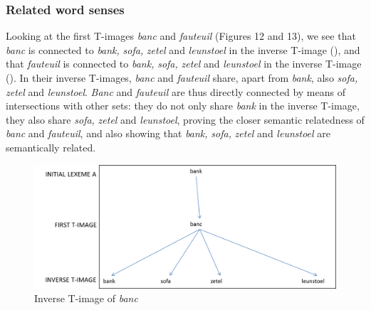 \subsubsection{\label{sec:3.4.3.2}  Related word senses}

Looking at the first T-images \textit{banc} and \textit{fauteuil} (Figures 12 and 13), we see that \textit{banc} is connected to \textit{bank,} \textit{sofa,} \textit{zetel} and \textit{leunstoel} in the inverse T-image (), and that \textit{fauteuil} is connected to \textit{bank,} \textit{sofa,} \textit{zetel} and \textit{leunstoel} in the inverse T-image (). In their inverse T-images, \textit{banc} and \textit{fauteuil} share, apart from \textit{bank}, also \textit{sofa,} \textit{zetel} and \textit{leunstoel}. \textit{Banc} and \textit{fauteuil} are thus directly connected by means of intersections with other sets: they do not only share \textit{bank} in the inverse T-image, they also share \textit{sofa,} \textit{zetel} and \textit{leunstoel}, proving the closer semantic relatedness of \textit{banc} and \textit{fauteuil}, and also showing that \textit{bank,} \textit{sofa,} \textit{zetel} and \textit{leunstoel} are semantically related.

\begin{figure}
\includegraphics[height=.3\textheight]{figures/Vandevoorde2-img11.png}
\caption{\label{fig:key:12}  Inverse T-image of \textit{banc}}
\end{figure}

